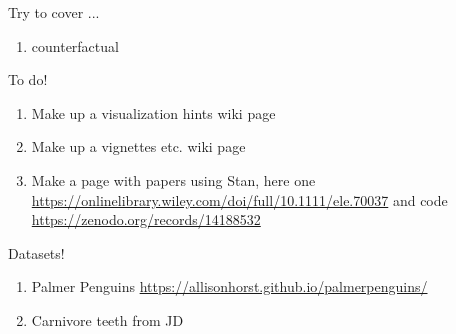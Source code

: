 \documentclass[11pt]{article}
\begin{document}

\renewcommand{\refname}{\CHead{}}

Try to cover ...
\begin{enumerate}
\item counterfactual
\end{enumerate}

To do!
\begin{enumerate}
\item Make up a visualization hints wiki page
\item Make up a vignettes etc. wiki page
\item Make a page with papers using Stan, here one \url{https://onlinelibrary.wiley.com/doi/full/10.1111/ele.70037} and code \url{https://zenodo.org/records/14188532}
\end{enumerate}


Datasets!
\begin{enumerate}
\item Palmer Penguins \url{https://allisonhorst.github.io/palmerpenguins/}
\item Carnivore teeth from JD 
\end{enumerate}
\end{document}
